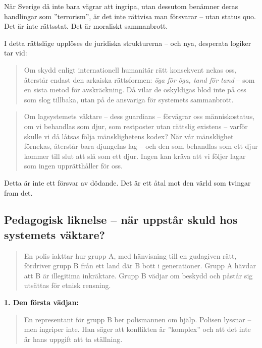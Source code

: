 \documentclass[12pt]{article}
\begin{document}
När Sverige då inte bara vägrar att ingripa, utan dessutom benämner deras handlingar som ”terrorism”, är det inte rättvisa man försvarar – utan status quo. Det är inte rättsstat. Det är moraliskt sammanbrott.

I detta rättsläge upplöses de juridiska strukturerna – och nya, desperata logiker tar vid:

\begin{quote}
Om skydd enligt internationell humanitär rätt konsekvent nekas oss, återstår endast den arkaiska rättsformen: \textit{öga för öga, tand för tand} – som en sista metod för avskräckning. Då vilar de oskyldigas blod inte på oss som slog tillbaka, utan på de ansvariga för systemets sammanbrott.
\end{quote}

\begin{quote}
Om lagsystemets väktare – dess guardians – förvägrar oss människostatus, om vi behandlas som djur, som restposter utan rättslig existens – varför skulle vi då låtsas följa mänsklighetens kodex? När vår mänsklighet förnekas, återstår bara djungelns lag – och den som behandlas som ett djur kommer till slut att slå som ett djur. Ingen kan kräva att vi följer lagar som ingen upprätthåller för oss.
\end{quote}

Detta är inte ett försvar av dödande. Det är ett åtal mot den värld som tvingar fram det.




\subsection*{Pedagogisk liknelse – när uppstår skuld hos systemets väktare?}

\begin{quote}
En polis iakttar hur grupp A, med hänvisning till en gudagiven rätt, fördriver grupp B från ett land där B bott i generationer. Grupp A hävdar att B är illegitima inkräktare. Grupp B vädjar om beskydd och påstår sig utsättas för etnisk rensning.
\end{quote}

\textbf{1. Den första vädjan:}
\begin{quote}
En representant för grupp B ber polismannen om hjälp. Polisen lyssnar – men ingriper inte. Han säger att konflikten är ”komplex” och att det inte är hans uppgift att ta ställning.
\end{quote}
\end{document}
